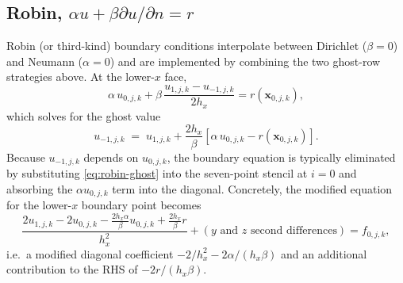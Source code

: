 \documentclass[11pt]{article}
\theoremstyle{definition}
\newcommand{\bx}{\mathbf{x}}
\begin{document}
\subsection{Robin, $\alpha u + \beta \partial u/\partial n = r$}\label{sec:bc-robin}
Robin (or third-kind) boundary conditions interpolate between Dirichlet
($\beta=0$) and Neumann ($\alpha=0$) and are implemented by combining
the two ghost-row strategies above.  At the lower-$x$ face,
\begin{equation*}
  \alpha\, u_{0,j,k} + \beta\, \frac{u_{1,j,k} - u_{-1,j,k}}{2h_x}
  = r(\bx_{0,j,k}),
\end{equation*}
which solves for the ghost value
\begin{equation}\label{eq:robin-ghost}
  u_{-1,j,k} \;=\; u_{1,j,k} + \frac{2h_x}{\beta}\!\left[
    \alpha\, u_{0,j,k} - r(\bx_{0,j,k}) \right].
\end{equation}
Because $u_{-1,j,k}$ depends on $u_{0,j,k}$, the boundary equation is
typically eliminated by substituting \eqref{eq:robin-ghost} into the
seven-point stencil at $i=0$ and absorbing the $\alpha u_{0,j,k}$ term
into the diagonal.  Concretely, the modified equation for the
lower-$x$ boundary point becomes
\begin{equation}\label{eq:robin-eqn}
  \frac{2 u_{1,j,k} - 2 u_{0,j,k} - \tfrac{2h_x \alpha}{\beta} u_{0,j,k}
        + \tfrac{2h_x}{\beta} r}{h_x^2}
  + (\text{$y$ and $z$ second differences})
  = f_{0,j,k},
\end{equation}
i.e.\ a modified diagonal coefficient $-2/h_x^2 - 2\alpha/(h_x\beta)$ and
an additional contribution to the RHS of $-2 r / (h_x \beta)$.
\end{document}
